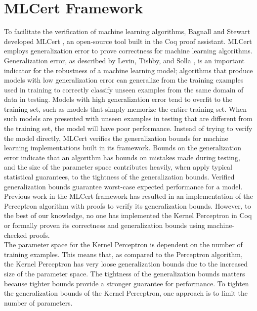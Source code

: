 \section{MLCert Framework}\label{MLCertFrameworkSection}
To facilitate the verification of machine learning algorithms, Bagnall and Stewart developed MLCert \cite{BS19}, an open-source tool built in the Coq proof assistant. MLCert employs generalization error to prove correctness for machine learning algorithms. Generalization error, as described by Levin, Tishby, and Solla \cite{LTS90}, is an important indicator for the robustness of a machine learning model; algorithms that produce models with low generalization error can generalize from the training examples used in training to correctly classify unseen examples from the same domain of data in testing. Models with high generalization error tend to overfit to the training set, such as models that simply memorize the entire training set. When such models are presented with unseen examples in testing that are different from the training set, the model will have poor performance. Instead of trying to verify the model directly, MLCert verifies the generalization bounds for machine learning implementations built in its framework. Bounds on the generalization error indicate that an algorithm has bounds on mistakes made during testing, and the size of the parameter space contributes heavily, when apply typical statistical guarantees, to the tightness of the generalization bounds. Verified generalization bounds guarantee worst-case expected performance for a model. Previous work in the MLCert framework \cite{BS19} has resulted in an implementation of the Perceptron algorithm with proofs to verify its generalization bounds. However, to the best of our knowledge, no one has implemented the Kernel Perceptron in Coq or formally proven its correctness and generalization bounds using machine-checked proofs.
\\The parameter space for the Kernel Perceptron is dependent on the number of training examples. This means that, as compared to the Perceptron algorithm, the Kernel Perceptron has very loose generalization bounds due to the increased size of the parameter space. The tightness of the generalization bounds matters because tighter bounds provide a stronger guarantee for performance. To tighten the generalization bounds of the Kernel Perceptron, one approach is to limit the number of parameters.
